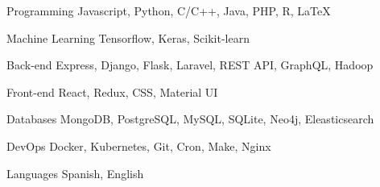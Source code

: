 

\begin{cvskills}

  \cvskill
    {Programming} %
    {Javascript, Python, C/C++, Java, PHP, R, LaTeX} %

\cvskill
{Machine Learning} %
{Tensorflow, Keras, Scikit-learn} %

  \cvskill
    {Back-end} %
    {Express, Django, Flask, Laravel, REST API, GraphQL, Hadoop} %

  \cvskill
    {Front-end} %
    {React, Redux, CSS, Material UI} %

\cvskill
{Databases} %
{MongoDB, PostgreSQL, MySQL, SQLite, Neo4j, Eleasticsearch} %

\cvskill
{DevOps} %
{Docker, Kubernetes, Git, Cron, Make, Nginx} %

  \cvskill
    {Languages} %
    {Spanish, English} %



\end{cvskills}
